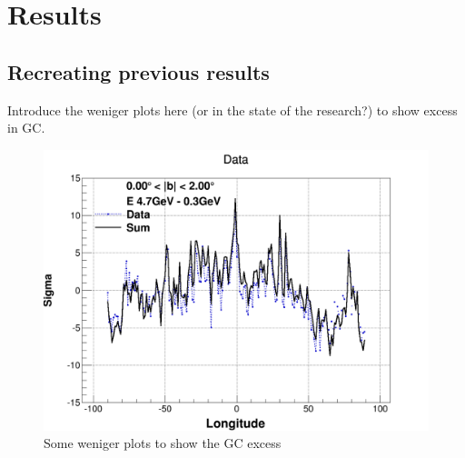 \chapter{Results}
\label{ch:results}
%

\section{Recreating previous results}
\label{sec:results_recreating_prev_res}

Introduce the weniger plots here (or in the state of the research?) to show excess in GC.
\begin{figure}[h]
  \centering
  \includegraphics[width=.5\linewidth]{pic/results/Weniger_SUM_b0-2_E4,7-0,31GeV.png}
  \caption{Some weniger plots to show the GC excess}
  \label{fig:weniger_plot}
\end{figure}


